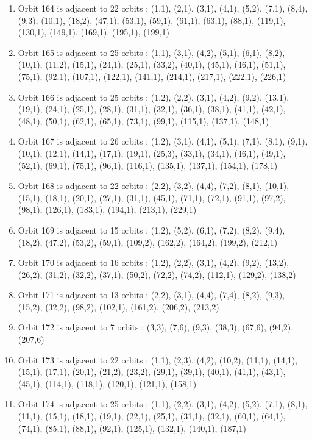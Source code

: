 \documentclass[12pt]{article}
\begin{document}
\begin{enumerate}
\item Orbit 164 is adjacent to 22 orbits : (1,1), (2,1), (3,1), (4,1), (5,2), (7,1), (8,4), (9,3), (10,1), (18,2), (47,1), (53,1), (59,1), (61,1), (63,1), (88,1), (119,1), (130,1), (149,1), (169,1), (195,1), (199,1)
\item Orbit 165 is adjacent to 25 orbits : (1,1), (3,1), (4,2), (5,1), (6,1), (8,2), (10,1), (11,2), (15,1), (24,1), (25,1), (33,2), (40,1), (45,1), (46,1), (51,1), (75,1), (92,1), (107,1), (122,1), (141,1), (214,1), (217,1), (222,1), (226,1)
\item Orbit 166 is adjacent to 25 orbits : (1,2), (2,2), (3,1), (4,2), (9,2), (13,1), (19,1), (24,1), (25,1), (28,1), (31,1), (32,1), (36,1), (38,1), (41,1), (42,1), (48,1), (50,1), (62,1), (65,1), (73,1), (99,1), (115,1), (137,1), (148,1)
\item Orbit 167 is adjacent to 26 orbits : (1,2), (3,1), (4,1), (5,1), (7,1), (8,1), (9,1), (10,1), (12,1), (14,1), (17,1), (19,1), (25,3), (33,1), (34,1), (46,1), (49,1), (52,1), (69,1), (75,1), (96,1), (116,1), (135,1), (137,1), (154,1), (178,1)
\item Orbit 168 is adjacent to 22 orbits : (2,2), (3,2), (4,4), (7,2), (8,1), (10,1), (15,1), (18,1), (20,1), (27,1), (31,1), (45,1), (71,1), (72,1), (91,1), (97,2), (98,1), (126,1), (183,1), (194,1), (213,1), (229,1)
\item Orbit 169 is adjacent to 15 orbits : (1,2), (5,2), (6,1), (7,2), (8,2), (9,4), (18,2), (47,2), (53,2), (59,1), (109,2), (162,2), (164,2), (199,2), (212,1)
\item Orbit 170 is adjacent to 16 orbits : (1,2), (2,2), (3,1), (4,2), (9,2), (13,2), (26,2), (31,2), (32,2), (37,1), (50,2), (72,2), (74,2), (112,1), (129,2), (138,2)
\item Orbit 171 is adjacent to 13 orbits : (2,2), (3,1), (4,4), (7,4), (8,2), (9,3), (15,2), (32,2), (98,2), (102,1), (161,2), (206,2), (213,2)
\item Orbit 172 is adjacent to 7 orbits : (3,3), (7,6), (9,3), (38,3), (67,6), (94,2), (207,6)
\item Orbit 173 is adjacent to 22 orbits : (1,1), (2,3), (4,2), (10,2), (11,1), (14,1), (15,1), (17,1), (20,1), (21,2), (23,2), (29,1), (39,1), (40,1), (41,1), (43,1), (45,1), (114,1), (118,1), (120,1), (121,1), (158,1)
\item Orbit 174 is adjacent to 25 orbits : (1,1), (2,2), (3,1), (4,2), (5,2), (7,1), (8,1), (11,1), (15,1), (18,1), (19,1), (22,1), (25,1), (31,1), (32,1), (60,1), (64,1), (74,1), (85,1), (88,1), (92,1), (125,1), (132,1), (140,1), (187,1)

\end{enumerate}
\end{document}
